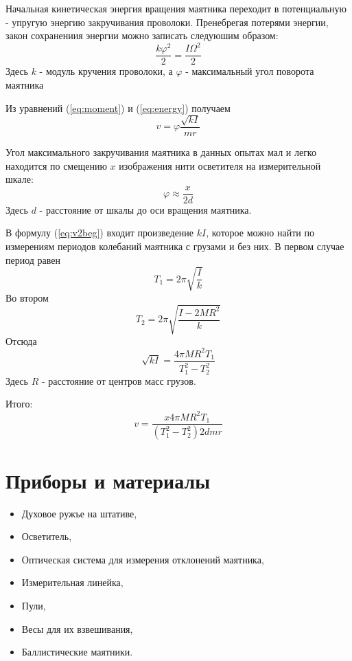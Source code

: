 \documentclass[a4paper, 12pt]{article}
\begin{document}
			Начальная кинетическая энергия вращения маятника переходит в потенциальную - упругую энергию закручивания проволоки.
			Пренебрегая потерями энергии, закон сохранениия энергии можно записать следуюшим образом:
			\begin{equation} \label{eq:energy}
				\frac{k\varphi^2}{2} = \frac{I\Omega^2}{2}	
			\end{equation}
			Здесь $k$ - модуль кручения проволоки, а $\varphi$ - максимальный угол поворота маятника

			Из уравнений (\ref{eq:moment}) и (\ref{eq:energy}) получаем
			\begin{equation} \label{eq:v2beg}
				v = \varphi \frac{\sqrt{kI}}{mr}
			\end{equation}

			Угол максимального закручивания маятника в данных опытах мал и легко находится по смещению $x$ изображения нити осветителя на измерительной шкале:
			\[
				\varphi \approx \frac{x}{2d}
			\]
			Здесь $d$ - расстояние от шкалы до оси вращения маятника.

			В формулу (\ref{eq:v2beg}) входит произведение $kI$, которое можно найти по измерениям периодов колебаний маятника с грузами и 
			без них. В первом случае период равен
			\[
				T_1 = 2\pi\sqrt{\frac{I}{k}}
			\]
			Во втором
			\[
				T_2 = 2\pi\sqrt{\frac{I-2MR^2}{k}}
			\]
			Отсюда
			\[
				\sqrt{kI} = \frac{4\pi MR^2T_1}{T_1^2 - T_2^2}
			\]
			Здесь $R$ - расстояние от центров масс грузов.

			Итого:
			\begin{equation} \label{eq:v2}
				v = \frac{x4\pi MR^2T_1}{(T_1^2 - T_2^2)2dmr}
			\end{equation}

	\section{Приборы и материалы}

		\begin{itemize}
			\item Духовое ружъе на штативе,
			\item Осветитель,
			\item Оптическая система для измерения отклонений маятника,
			\item Измерительная линейка,
			\item Пули,
			\item Весы для их взвешивания,
			\item Баллистические маятники.
		\end{itemize}
\end{document}
